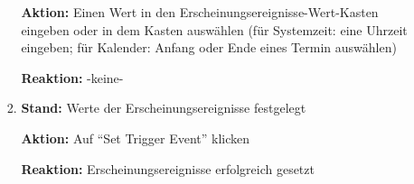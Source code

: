 \documentclass[a4paper]{scrreprt}
\begin{document}
\begin{itemize}
\begin{itemize}
\begin{enumerate}
		                	\par \textbf{Aktion: }Einen Wert in den \gls{Erscheinungsereignis}se-Wert-Kasten eingeben oder in dem Kasten auswählen (für Systemzeit: eine Uhrzeit eingeben; für Kalender: Anfang oder Ende eines Termin auswählen)
		                	\par \textbf{Reaktion: }-keine-
		                	\item \par \textbf{Stand: }Werte der \gls{Erscheinungsereignis}se festgelegt
		                	\par \textbf{Aktion: }Auf ``Set Trigger Event'' klicken
		                	\par \textbf{Reaktion: }\gls{Erscheinungsereignis}se erfolgreich gesetzt
		                \end{enumerate}
                \end{itemize}


\end{itemize}
\end{document}

